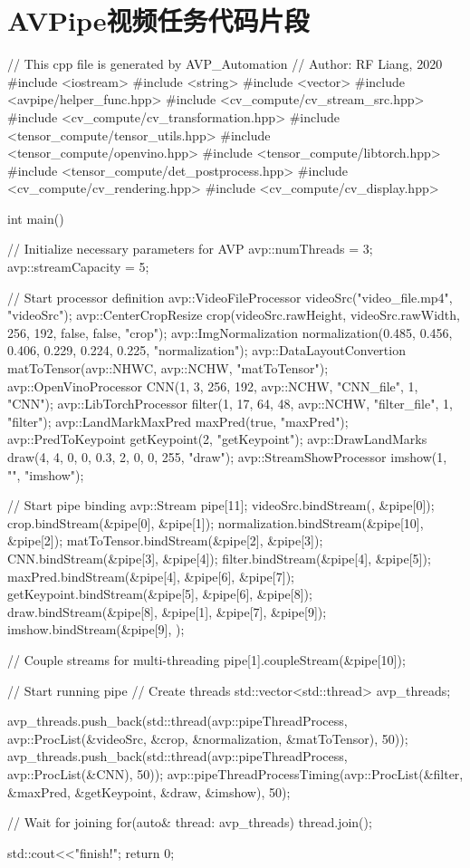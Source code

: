 \chapter{AVPipe视频任务代码片段}\label{app:code}
\begin{codeblock}[language=C++, basicstyle=\ttfamily\footnotesize, numbers=left, caption=Pose Example]\label{code:pose}
// This cpp file is generated by AVP\_Automation
// Author: RF Liang, 2020
#include <iostream>
#include <string>
#include <vector>
#include <avpipe/helper_func.hpp>
#include <cv_compute/cv_stream_src.hpp>
#include <cv_compute/cv_transformation.hpp>
#include <tensor_compute/tensor_utils.hpp>
#include <tensor_compute/openvino.hpp>
#include <tensor_compute/libtorch.hpp>
#include <tensor_compute/det_postprocess.hpp>
#include <cv_compute/cv_rendering.hpp>
#include <cv_compute/cv_display.hpp>

int main()
{
    // Initialize necessary parameters for AVP
    avp::numThreads = 3;
    avp::streamCapacity = 5;

    // Start processor definition
    avp::VideoFileProcessor videoSrc("video_file.mp4", "videoSrc");
    avp::CenterCropResize crop(videoSrc.rawHeight, videoSrc.rawWidth, 256, 192, false, false, "crop");
    avp::ImgNormalization normalization({0.485, 0.456, 0.406}, {0.229, 0.224, 0.225}, "normalization");
    avp::DataLayoutConvertion matToTensor(avp::NHWC, avp::NCHW, "matToTensor");
    avp::OpenVinoProcessor CNN({1, 3, 256, 192}, avp::NCHW, "CNN_file", 1, "CNN");
    avp::LibTorchProcessor filter({1, 17, 64, 48}, avp::NCHW, "filter_file", 1, "filter");
    avp::LandMarkMaxPred maxPred(true, "maxPred");
    avp::PredToKeypoint getKeypoint(2, "getKeypoint");
    avp::DrawLandMarks draw(4, 4, 0, 0, 0.3, 2, {0, 0, 255}, "draw");
    avp::StreamShowProcessor imshow(1, "", "imshow");

    // Start pipe binding
    avp::Stream pipe[11];
    videoSrc.bindStream({}, {&pipe[0]});
    crop.bindStream({&pipe[0]}, {&pipe[1]});
    normalization.bindStream({&pipe[10]}, {&pipe[2]});
    matToTensor.bindStream({&pipe[2]}, {&pipe[3]});
    CNN.bindStream({&pipe[3]}, {&pipe[4]});
    filter.bindStream({&pipe[4]}, {&pipe[5]});
    maxPred.bindStream({&pipe[4]}, {&pipe[6], &pipe[7]});
    getKeypoint.bindStream({&pipe[5], &pipe[6]}, {&pipe[8]});
    draw.bindStream({&pipe[8], &pipe[1], &pipe[7]}, {&pipe[9]});
    imshow.bindStream({&pipe[9]}, {});

    // Couple streams for multi-threading
    pipe[1].coupleStream({&pipe[10]});
    
    // Start running pipe
    // Create threads
    std::vector<std::thread> avp_threads;
    
    avp_threads.push_back(std::thread(avp::pipeThreadProcess, avp::ProcList({&videoSrc, &crop, &normalization, &matToTensor}), 50));
    avp_threads.push_back(std::thread(avp::pipeThreadProcess, avp::ProcList({&CNN}), 50));
    avp::pipeThreadProcessTiming(avp::ProcList({&filter, &maxPred, &getKeypoint, &draw, &imshow}), 50);

    // Wait for joining
    for(auto& thread: avp_threads)
        thread.join();

    std::cout<<"\nAVP finish!\n";
    return 0;
}
\end{codeblock}
